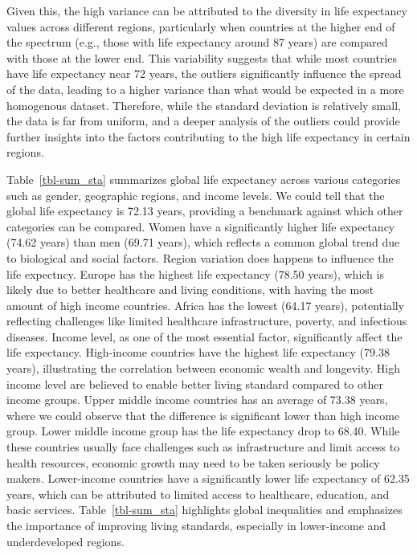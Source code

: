 \documentclass[
  letterpaper,
  DIV=11,
  numbers=noendperiod]{scrartcl}
\begin{document}
Given this, the high variance can be attributed to the diversity in life
expectancy values across different regions, particularly when countries
at the higher end of the spectrum (e.g., those with life expectancy
around 87 years) are compared with those at the lower end. This
variability suggests that while most countries have life expectancy near
72 years, the outliers significantly influence the spread of the data,
leading to a higher variance than what would be expected in a more
homogenous dataset. Therefore, while the standard deviation is
relatively small, the data is far from uniform, and a deeper analysis of
the outliers could provide further insights into the factors
contributing to the high life expectancy in certain regions.

Table~\ref{tbl-sum_sta} summarizes global life expectancy across various
categories such as gender, geographic regions, and income levels. We
could tell that the global life expectancy is 72.13 years, providing a
benchmark against which other categories can be compared. Women have a
significantly higher life expectancy (74.62 years) than men (69.71
years), which reflects a common global trend due to biological and
social factors. Region variation does happens to influence the life
expectncy. Europe has the highest life expectancy (78.50 years), which
is likely due to better healthcare and living conditions, with having
the most amount of high income countries. Africa has the lowest (64.17
years), potentially reflecting challenges like limited healthcare
infrastructure, poverty, and infectious diseases. Income level, as one
of the most essential factor, significantly affect the life expectancy.
High-income countries have the highest life expectancy (79.38 years),
illustrating the correlation between economic wealth and longevity. High
income level are believed to enable better living standard compared to
other income groups. Upper middle income countries has an average of
73.38 years, where we could observe that the difference is significant
lower than high income group. Lower middle income group has the life
expectancy drop to 68.40. While these countries usually face challenges
such as infrastructure and limit access to health resources, economic
growth may need to be taken seriously be policy makers. Lower-income
countries have a significantly lower life expectancy of 62.35 years,
which can be attributed to limited access to healthcare, education, and
basic services. Table~\ref{tbl-sum_sta} highlights global inequalities
and emphasizes the importance of improving living standards, especially
in lower-income and underdeveloped regions.
\end{document}
